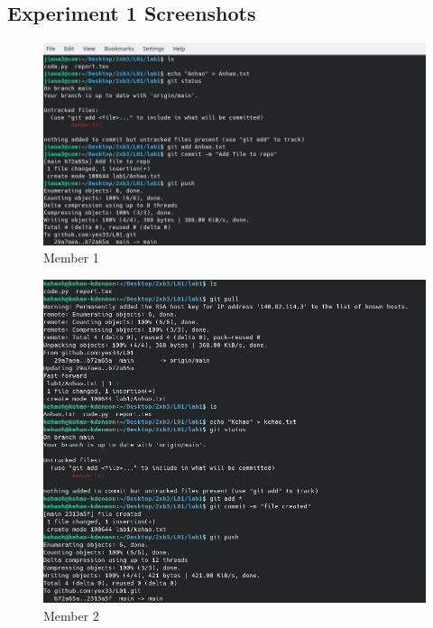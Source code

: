 \documentclass[titlepage, 12pt]{article}
\begin{document}
\begin{appendices}
  \section{Experiment 1 Screenshots}

  \begin{figure}[H]
    \includegraphics[width=\textwidth]{e1m1}
    \caption{Member 1}
  \end{figure}
  \begin{figure}[H]
    \includegraphics[width=\textwidth]{e1m2}
    \caption{Member 2}
  \end{figure}
  \begin{figure}[H]

\end{figure}
\end{appendices}
\end{document}
